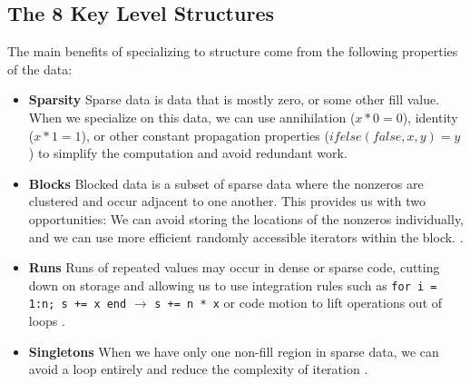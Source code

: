 \subsection{The 8 Key Level Structures}

    The main benefits of specializing to structure come from the following properties of the data:
    \begin{itemize}
        \item \textbf{Sparsity} Sparse data is data that is mostly zero, or some other
        fill value. When we specialize on this data, we can use annihilation ($x
        * 0 = 0$), identity ($x * 1 = 1$), or other constant propagation
        properties ($ifelse(false, x, y) = y$) to simplify the computation and avoid
        redundant work.
        
        \item \textbf{Blocks} Blocked data is a subset of sparse data where the nonzeros
        are clustered and occur adjacent to one another. This provides us with
        two opportunities: We can avoid storing the locations of the nonzeros
        individually, and we can use more efficient randomly accessible
        iterators within the block. \cite{im_optimizing_2001, vuduc_performance_2002, ahrens_looplets_2023}.

        \item \textbf{Runs} Runs of repeated values may occur in dense or sparse code,
        cutting down on storage and allowing us to use integration rules such as 
        \texttt{for i = 1:n; s += x end} $\rightarrow$
        \texttt{s += n * x} or code motion to lift operations out of loops \cite{donenfeld_unified_2022,ahrens_looplets_2023}.

        \item \textbf{Singletons} When we have only one non-fill region in sparse data,
        we can avoid a loop entirely and reduce the complexity of iteration \cite{ghorbani2023compiling, ahrens_looplets_2023}.
    \end{itemize}

